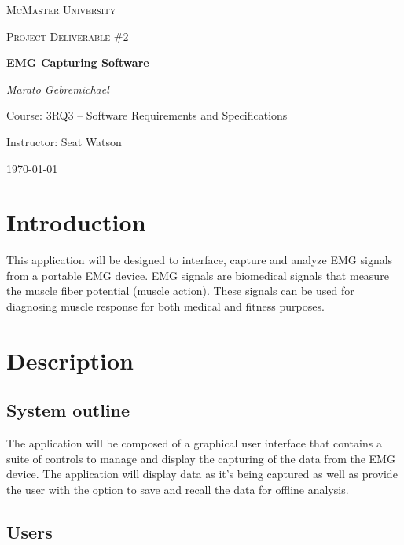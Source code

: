 \documentclass[12pt,a4paper]{article}
\begin{document}
\begin{titlepage}
	\centering
	{\scshape\LARGE McMaster University \par}
	\vspace{2cm}
	{\scshape\Large Project Deliverable \#2 \par}
	\vspace{4cm}
	{\huge\bfseries EMG Capturing Software\par}
	\vspace{2cm}
	{\Large\itshape Marato Gebremichael\par}
	
	\vfill
	Course: 3RQ3 – Software Requirements and Specifications\par
    Instructor: Seat Watson

	\vfill

	{\large \today\par}
\end{titlepage}

\tableofcontents

\newpage

\section{Introduction}

\indent This application will be designed to interface, capture and analyze EMG signals from a portable EMG device. 
EMG signals are biomedical signals that measure the muscle fiber potential (muscle action). 
These signals can be used for diagnosing muscle response for both medical and fitness purposes.

\section{Description}

\subsection{System outline}

The application will be composed of a graphical user interface that contains a suite of controls to manage and 
display the capturing of the data from the EMG device. The application will display data as it's being captured as well as provide the user with the option to save and recall the data for offline analysis.

\subsection{Users}
\end{document}
